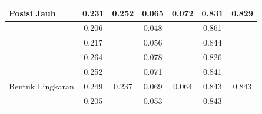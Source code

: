 \documentclass[conference]{IEEEtran}
\begin{document}
\begin{table}[]
\begin{tabular}{|l|cc|cc|cc|}
  \multirow{-5}{*}{Posisi Jauh}                & \multicolumn{1}{c|}{\cellcolor[HTML]{FFFFFF}0.231} & \multirow{-5}{*}{\cellcolor[HTML]{FFFFFF}0.252} & \multicolumn{1}{c|}{\cellcolor[HTML]{FFFFFF}0.065} & \multirow{-5}{*}{\cellcolor[HTML]{FFFFFF}0.072} & \multicolumn{1}{c|}{\cellcolor[HTML]{FFFFFF}0.831} & \multirow{-5}{*}{\cellcolor[HTML]{FFFFFF}0.829} \\ \hline
                                                      & \multicolumn{1}{c|}{\cellcolor[HTML]{FFFFFF}0.206} & \cellcolor[HTML]{FFFFFF}                         & \multicolumn{1}{c|}{\cellcolor[HTML]{FFFFFF}0.048} & \cellcolor[HTML]{FFFFFF}                           & \multicolumn{1}{c|}{\cellcolor[HTML]{FFFFFF}0.861} & \cellcolor[HTML]{FFFFFF}                        \\ \cline{2-2} \cline{4-4} \cline{6-6}
                                                      & \multicolumn{1}{c|}{\cellcolor[HTML]{FFFFFF}0.217} & \cellcolor[HTML]{FFFFFF}                         & \multicolumn{1}{c|}{\cellcolor[HTML]{FFFFFF}0.056}  & \cellcolor[HTML]{FFFFFF}                           & \multicolumn{1}{c|}{\cellcolor[HTML]{FFFFFF}0.844} & \cellcolor[HTML]{FFFFFF}                        \\ \cline{2-2} \cline{4-4} \cline{6-6}
                                                      & \multicolumn{1}{c|}{\cellcolor[HTML]{FFFFFF}0.264} & \cellcolor[HTML]{FFFFFF}                         & \multicolumn{1}{c|}{\cellcolor[HTML]{FFFFFF}0.078} & \cellcolor[HTML]{FFFFFF}                           & \multicolumn{1}{c|}{\cellcolor[HTML]{FFFFFF}0.826} & \cellcolor[HTML]{FFFFFF}                        \\ \cline{2-2} \cline{4-4} \cline{6-6}
                                                      & \multicolumn{1}{c|}{\cellcolor[HTML]{FFFFFF}0.252} & \cellcolor[HTML]{FFFFFF}                         & \multicolumn{1}{c|}{\cellcolor[HTML]{FFFFFF}0.071} & \cellcolor[HTML]{FFFFFF}                           & \multicolumn{1}{c|}{\cellcolor[HTML]{FFFFFF}0.841} & \cellcolor[HTML]{FFFFFF}                        \\ \cline{2-2} \cline{4-4} \cline{6-6}
  \multirow{-5}{*}{Bentuk Lingkaran} & \multicolumn{1}{c|}{\cellcolor[HTML]{FFFFFF}0.249} & \multirow{-5}{*}{\cellcolor[HTML]{FFFFFF}0.237} & \multicolumn{1}{c|}{\cellcolor[HTML]{FFFFFF}0.069} & \multirow{-5}{*}{\cellcolor[HTML]{FFFFFF}0.064} & \multicolumn{1}{c|}{\cellcolor[HTML]{FFFFFF}0.843} & \multirow{-5}{*}{\cellcolor[HTML]{FFFFFF}0.843} \\ \hline
                                                      & \multicolumn{1}{c|}{\cellcolor[HTML]{FFFFFF}0.205} & \cellcolor[HTML]{FFFFFF}                         & \multicolumn{1}{c|}{\cellcolor[HTML]{FFFFFF}0.053} & \cellcolor[HTML]{FFFFFF}                           & \multicolumn{1}{c|}{\cellcolor[HTML]{FFFFFF}0.843} & \cellcolor[HTML]{FFFFFF}                        \\ \cline{2-2} \cline{4-4} \cline{6-6}

\end{tabular}
\end{table}
\end{document}
